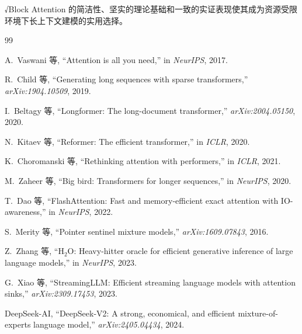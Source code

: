 \documentclass[11pt,a4paper,fontset=mac]{ctexart}
\begin{document}
√Block Attention 的简洁性、坚实的理论基础和一致的实证表现使其成为资源受限环境下长上下文建模的实用选择。

\begin{thebibliography}{99}

A.~Vaswani 等, ``Attention is all you need,'' in \textit{NeurIPS}, 2017.

R.~Child 等, ``Generating long sequences with sparse transformers,'' \textit{arXiv:1904.10509}, 2019.

I.~Beltagy 等, ``Longformer: The long-document transformer,'' \textit{arXiv:2004.05150}, 2020.

N.~Kitaev 等, ``Reformer: The efficient transformer,'' in \textit{ICLR}, 2020.

K.~Choromanski 等, ``Rethinking attention with performers,'' in \textit{ICLR}, 2021.

M.~Zaheer 等, ``Big bird: Transformers for longer sequences,'' in \textit{NeurIPS}, 2020.

T.~Dao 等, ``FlashAttention: Fast and memory-efficient exact attention with IO-awareness,'' in \textit{NeurIPS}, 2022.

S.~Merity 等, ``Pointer sentinel mixture models,'' \textit{arXiv:1609.07843}, 2016.

Z.~Zhang 等, ``H$_2$O: Heavy-hitter oracle for efficient generative inference of large language models,'' in \textit{NeurIPS}, 2023.

G.~Xiao 等, ``StreamingLLM: Efficient streaming language models with attention sinks,'' \textit{arXiv:2309.17453}, 2023.

DeepSeek-AI, ``DeepSeek-V2: A strong, economical, and efficient mixture-of-experts language model,'' \textit{arXiv:2405.04434}, 2024.

\end{thebibliography}
\end{document}
